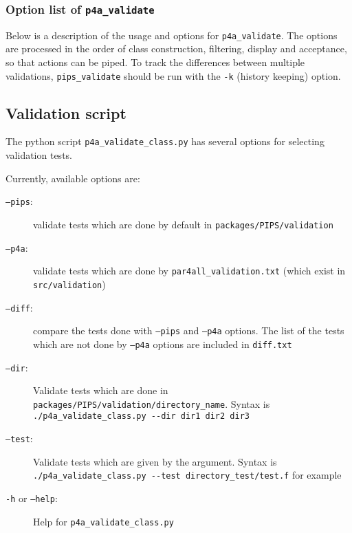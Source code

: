 \documentclass[a4paper]{article}
\begin{document}
\subsubsection{Option list of \protect\texttt{p4a\_validate}}
\label{sec:opti-list-p4a_v-1}

Below is a description of the usage and options for
\verb|p4a_validate|. The options are processed in the order of class
construction, filtering, display and acceptance, so that
actions can be piped. To track the differences between
multiple validations, \verb|pips_validate| should be run with the
\texttt{-k} (history keeping) option.




\subsection{Validation script}
\label{sec:validation_script}

The python script \verb|p4a_validate_class.py| has several options for
selecting validation tests.

Currently, available options are:
\begin{description}
\item[\texttt{--pips}:] validate tests which are done by default in
  \texttt{packages/PIPS/validation}

\item[\texttt{--p4a}:] validate tests which are done by
  \verb|par4all_validation.txt| (which exist in
  \texttt{src/validation})

\item[\texttt{--diff}:] compare the tests done with
  \texttt{--pips} and \texttt{--p4a} options. The list of the tests which
  are not done by \texttt{--p4a} options are included in \texttt{diff.txt}

\item[\texttt{--dir}:] Validate tests which are done in \verb|packages/PIPS/validation/directory_name|. Syntax is \verb|./p4a_validate_class.py --dir dir1 dir2 dir3|

\item[\texttt{--test}:] Validate tests which are given by the argument. Syntax is \verb|./p4a_validate_class.py --test directory_test/test.f| for example

\item[\texttt{-h} or \texttt{--help}:] Help for \verb|p4a_validate_class.py|
\end{description}
\end{document}
